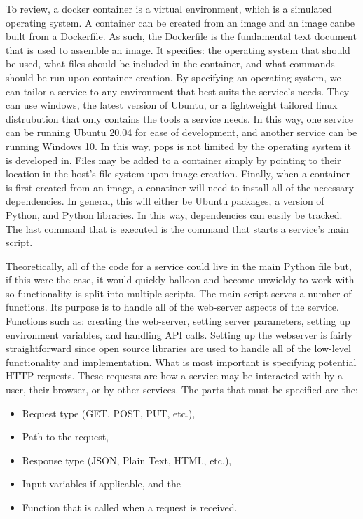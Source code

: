 To review, a docker container is a virtual environment, which is a simulated
operating system. A container can be created from an image and an image canbe
built from a Dockerfile. As such, the Dockerfile is the fundamental text
document that is used to assemble an image. It specifies: the operating system
that should be used, what files should be included in the container, and what
commands should be run upon container creation. By specifying an operating
system, we can tailor a service to any environment that best suits the service's
needs. They can use windows, the latest version of Ubuntu, or a lightweight
tailored linux distrubution that only contains the tools a service needs. In
this way, one service can be running Ubuntu 20.04 for ease of development, and
another service can be running Windows 10. In this way, \gls{pops} is not
limited by the operating system it is developed in. Files may  be added to a
container simply by pointing to their location in the host's file system upon
image creation. Finally, when a container is first created from an image, a
conatiner will need to install all of the necessary dependencies. In general,
this will either be Ubuntu packages, a version of Python, and Python libraries.
In this way, dependencies can easily be tracked. The last command that is
executed is the command that starts a service's main script.

Theoretically, all of the code for a service could live in the main Python file
but, if this were the case, it would quickly balloon and become unwieldy to work
with so functionality is split into multiple scripts. The main script serves a
number of functions. Its purpose is to handle all of the web-server aspects of
the service. Functions such as: creating the web-server, setting server
parameters, setting up environment variables, and handling API calls. Setting up
the webserver is fairly straightforward since open source libraries are used to
handle all of the low-level functionality and implementation. What is most
important is specifying potential HTTP requests. These requests are how a
service may be interacted with by a user, their browser, or by other services.
The parts that must be specified are the: 

\begin{itemize}
    \item Request type (GET, POST, PUT, etc.), 
    \item Path to the request, 
    \item Response type (JSON, Plain Text, HTML, etc.), 
    \item Input variables if applicable, and the 
    \item Function that is called when a request is received.
\end{itemize}

